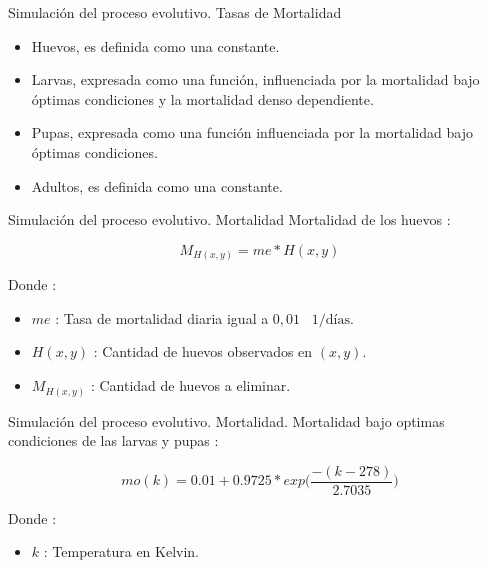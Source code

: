 \begin{frame}[c]{Simulación del proceso evolutivo. Tasas de Mortalidad}
  \begin{itemize}
    \item Huevos, es definida como una constante.
    \item Larvas, expresada como una función, influenciada por la mortalidad bajo óptimas condiciones y la mortalidad denso dependiente.
    \item Pupas, expresada como una función influenciada por la mortalidad bajo óptimas condiciones.
    \item Adultos, es definida como una constante.
  \end{itemize}
\end{frame}


\begin{frame}[c]{Simulación del proceso evolutivo. Mortalidad}
  Mortalidad de los huevos :
  \begin{center}
      \begin{equation}
          M_{H(x,y)} = me * H(x,y)
      \end{equation}
  \end{center}
  Donde :
    \begin{itemize}
      \item $me$ : Tasa de mortalidad diaria igual a $0,01$ \ $1/\text{días}$.
      \item $H(x, y)$ : Cantidad de huevos observados en $(x,y)$.
      \item $M_{H(x,y)}$ : Cantidad de huevos a eliminar.
    \end{itemize}
\end{frame}


\begin{frame}[c]{Simulación del proceso evolutivo. Mortalidad.}
 Mortalidad bajo optimas condiciones de las larvas y pupas :
\begin{center}
  \begin{equation}
  \label{eq:mortalidad-natural-larvas}
      mo(k) = 0.01 + 0.9725 * exp\bigg( \frac{-(k - 278)}{2.7035}\bigg)
  \end{equation}
\end{center}
Donde :
  \begin{itemize}
    \item $k$ : Temperatura en Kelvin.
  \end{itemize}
\end{frame}

